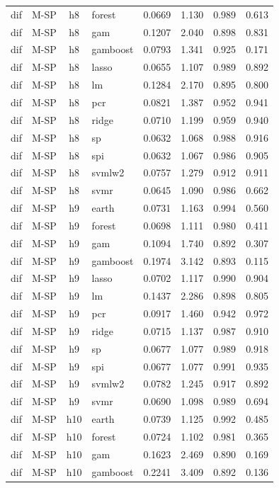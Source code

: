 \begin{ThreePartTable}
\begin{longtable}[t]{llclcccc}
dif & M-SP & h8 & forest & 0.0669 & 1.130 & 0.989 & 0.613\\
dif & M-SP & h8 & gam & 0.1207 & 2.040 & 0.898 & 0.831\\
dif & M-SP & h8 & gamboost & 0.0793 & 1.341 & 0.925 & 0.171\\
dif & M-SP & h8 & lasso & 0.0655 & 1.107 & 0.989 & 0.892\\
dif & M-SP & h8 & lm & 0.1284 & 2.170 & 0.895 & 0.800\\
dif & M-SP & h8 & pcr & 0.0821 & 1.387 & 0.952 & 0.941\\
dif & M-SP & h8 & ridge & 0.0710 & 1.199 & 0.959 & 0.940\\
dif & M-SP & h8 & sp & 0.0632 & 1.068 & 0.988 & 0.916\\
dif & M-SP & h8 & spi & 0.0632 & 1.067 & 0.986 & 0.905\\
dif & M-SP & h8 & svmlw2 & 0.0757 & 1.279 & 0.912 & 0.911\\
dif & M-SP & h8 & svmr & 0.0645 & 1.090 & 0.986 & 0.662\\
\addlinespace
dif & M-SP & h9 & earth & 0.0731 & 1.163 & 0.994 & 0.560\\
dif & M-SP & h9 & forest & 0.0698 & 1.111 & 0.980 & 0.411\\
dif & M-SP & h9 & gam & 0.1094 & 1.740 & 0.892 & 0.307\\
dif & M-SP & h9 & gamboost & 0.1974 & 3.142 & 0.893 & 0.115\\
dif & M-SP & h9 & lasso & 0.0702 & 1.117 & 0.990 & 0.904\\
dif & M-SP & h9 & lm & 0.1437 & 2.286 & 0.898 & 0.805\\
dif & M-SP & h9 & pcr & 0.0917 & 1.460 & 0.942 & 0.972\\
dif & M-SP & h9 & ridge & 0.0715 & 1.137 & 0.987 & 0.910\\
dif & M-SP & h9 & sp & 0.0677 & 1.077 & 0.989 & 0.918\\
dif & M-SP & h9 & spi & 0.0677 & 1.077 & 0.991 & 0.935\\
dif & M-SP & h9 & svmlw2 & 0.0782 & 1.245 & 0.917 & 0.892\\
dif & M-SP & h9 & svmr & 0.0690 & 1.098 & 0.989 & 0.694\\
\addlinespace
dif & M-SP & h10 & earth & 0.0739 & 1.125 & 0.992 & 0.485\\
dif & M-SP & h10 & forest & 0.0724 & 1.102 & 0.981 & 0.365\\
dif & M-SP & h10 & gam & 0.1623 & 2.469 & 0.890 & 0.169\\
dif & M-SP & h10 & gamboost & 0.2241 & 3.409 & 0.892 & 0.136\\

\end{longtable}
\end{ThreePartTable}
